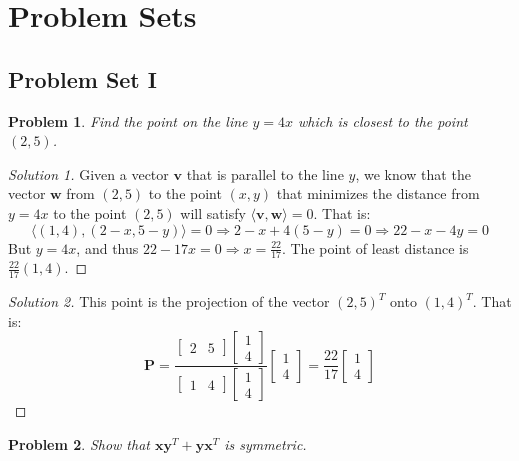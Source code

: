 \documentclass[oneside]{book}
\theoremstyle{mystyle}
\newtheorem{problem}{Problem}[section]
\begin{document}
\section{Problem Sets}
\subsection{Problem Set I}
\begin{problem}
Find the point on the line $y=4x$ which is closest to the point $(2,5)$.
\end{problem}
\begin{proof}[Solution 1]
Given a vector $\mathbf{v}$ that is parallel to the line $y$, we know that the vector $\mathbf{w}$ from $(2,5)$ to the point $(x,y)$ that minimizes the distance from $y=4x$ to the point $(2,5)$ will satisfy $\langle \mathbf{v}, \mathbf{w}\rangle = 0$. That is:
\begin{equation*}
    \big\langle (1,4), (2-x,5-y)\big\rangle = 0\Rightarrow 2-x+4(5-y) = 0 \Rightarrow 22 - x - 4 y = 0    
\end{equation*}
But $y = 4x$, and thus $22-17x = 0 \Rightarrow x= \frac{22}{17}$. The point of least distance is $\frac{22}{17}(1,4)$.
\end{proof}
\begin{proof}[Solution 2]
This point is the projection of the vector $(2,5)^T$ onto $(1,4)^T$. That is:
\begin{equation*}
    \mathbf{P} = \frac{\begin{bmatrix}2 & 5 \end{bmatrix} \begin{bmatrix} 1 \\ 4 \end{bmatrix}}{\begin{bmatrix} 1 & 4 \end{bmatrix} \begin{bmatrix} 1 \\ 4 \end{bmatrix}} \begin{bmatrix} 1 \\ 4 \end{bmatrix} = \frac{22}{17} \begin{bmatrix} 1 \\ 4\end{bmatrix}
\end{equation*}
\end{proof}
\begin{problem}
Show that $\mathbf{x}\mathbf{y}^T + \mathbf{y}\mathbf{x}^T$ is symmetric.
\end{problem}
\end{document}
